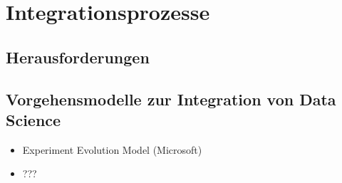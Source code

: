 \chapter[Integrationsprozesse]{Integrationsprozesse}

\section{Herausforderungen}

\section{Vorgehensmodelle zur Integration von Data Science}

\begin{itemize}
    \item Experiment Evolution Model (Microsoft)
    \item ???
\end{itemize}